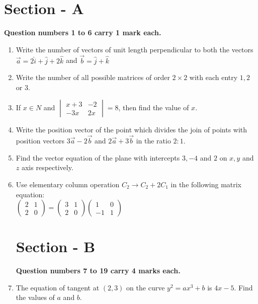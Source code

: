 \documentclass[12pt,-letter paper]{article}
\newcommand{\myvec}[1]{\ensuremath{\begin{pmatrix}#1\end{pmatrix}}}
\newcommand{\mydet}[1]{\ensuremath{\begin{vmatrix}#1\end{vmatrix}}}
\providecommand{\brak}[1]{\ensuremath{\left(#1\right)}}
\begin{document}
\section*{\textbf{Section - A}}
\textbf{Question numbers 1 to 6 carry 1 mark each.}\\

\begin{enumerate}

	\item Write the number of vectors of unit length perpendicular to both the vectors $\overrightarrow{a} = 2\hat{i}+\hat{j} + 2\hat{k}$ and $\overrightarrow{b} = \hat{j} + \hat{k}$\\
	
	\item Write the number of all possible matrices of order $2\times2$ with each entry $1, 2$ or $3$.\\
	
	\item If $ x \in N$ and $\mydet{x+3 & -2 \\ -3x & 2x} = 8$, then find the value of $x$.\\
	
	\item Write the position vector of the point which divides the join of points with position vectors $3\overrightarrow{a} - 2\overrightarrow{b}$ and $2\overrightarrow{a} + 3\overrightarrow{b}$ in the ratio $2:1$.\\
	
	\item Find the vector equation of the plane  with intercepts $3, -4$ and $2$ on $x, y$ and $z$ axis respectively.\\
	
	\item Use elementary column operation $ C_2 \rightarrow C_2  + 2C_1$ in the following matrix equation:\\
	$\myvec{2 & 1 \\ 2 & 0} = \myvec{3 & 1 \\ 2 & 0}\myvec{1 & 0 \\ -1 & 1}$\\
		
\section*{\textbf{Section - B}}
\textbf{Question numbers 7 to 19 carry 4 marks each.}\\

	\item The equation of tangent at $\brak{2,3}$ on the curve $y^2 = ax^3 + b$ is $4x -5$. Find the values of $a$ and $b$. \\
	

\end{enumerate}
\end{document}
